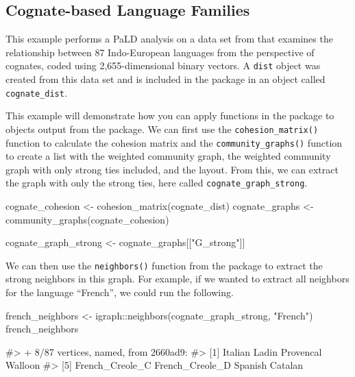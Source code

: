 \hypertarget{cognate-based-language-families}{%
\subsection{Cognate-based Language
Families}\label{cognate-based-language-families}}

This example performs a PaLD analysis on a data set from \citet{dyen92}
that examines the relationship between 87 Indo-European languages from
the perspective of cognates, coded using 2,655-dimensional binary
vectors. A \texttt{dist} object was created from this data set and is
included in the  package in an object called
\texttt{cognate\_dist}.

This example will demonstrate how you can apply functions in the
 package to objects output from the 
package. We can first use the \texttt{cohesion\_matrix()} function to
calculate the cohesion matrix and the \texttt{community\_graphs()}
function to create a list with the weighted community graph, the
weighted community graph with only strong ties included, and the layout.
From this, we can extract the graph with only the strong ties, here
called \texttt{cognate\_graph\_strong}.

\begin{Schunk}
\begin{Sinput}
cognate_cohesion <- cohesion_matrix(cognate_dist)
cognate_graphs <- community_graphs(cognate_cohesion)

cognate_graph_strong <- cognate_graphs[["G_strong"]]
\end{Sinput}
\end{Schunk}

We can then use the \texttt{neighbors()} function from the
 package to extract the strong neighbors in this graph.
For example, if we wanted to extract all neighbors for the language
``French'', we could run the following.

\begin{Schunk}
\begin{Sinput}
french_neighbors <- igraph::neighbors(cognate_graph_strong, "French")
french_neighbors
\end{Sinput}
\begin{Soutput}
#> + 8/87 vertices, named, from 2660ad9:
#> [1] Italian         Ladin           Provencal       Walloon        
#> [5] French_Creole_C French_Creole_D Spanish         Catalan
\end{Soutput}
\end{Schunk}

